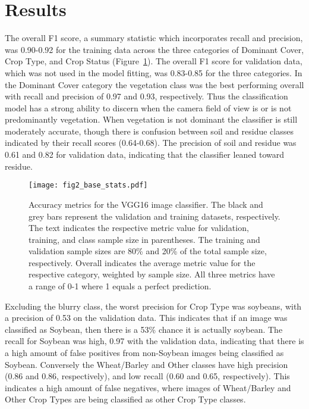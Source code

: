 \documentclass[remotesensing,article,submit,moreauthors,pdftex]{Definitions/mdpi}
\begin{document}
\section{Results}

The overall F1 score, a summary statistic which incorporates recall and precision, was 0.90-0.92 for the training data across the three categories of Dominant Cover, Crop Type, and Crop Status (Figure~\ref{fig2}). The overall F1 score for validation data, which was not used in the model fitting, was 0.83-0.85 for the three categories. In the Dominant Cover category the vegetation class was the best performing overall with recall and precision of 0.97 and 0.93, respectively. Thus the classification model has a strong ability to discern when the camera field of view is or is not predominantly vegetation. When vegetation is not dominant the classifier is still moderately accurate, though there is confusion between soil and residue classes indicated by their recall scores (0.64-0.68). The precision of soil and residue was 0.61 and 0.82 for validation data, indicating that the classifier leaned toward residue.

\begin{figure}[H]
    \centering
    \texttt{[image: fig2\_base\_stats.pdf]}
    \caption{Accuracy metrics for the VGG16 image classifier. The black and grey bars represent the validation and training datasets, respectively. The text indicates the respective metric value for validation, training, and class sample size in parentheses. The training and validation sample sizes are 80\% and 20\% of the total sample size, respectively. Overall indicates the average metric value for the respective category, weighted by sample size. All three metrics have a range of 0-1 where 1 equals a perfect prediction.}
    \label{fig2}
\end{figure}

Excluding the blurry class, the worst precision for Crop Type was soybeans, with a precision of 0.53 on the validation data. This indicates that if an image was classified as Soybean, then there is a 53\% chance it is actually soybean. The recall for Soybean was high, 0.97 with the validation data, indicating that there is a high amount of false positives from non-Soybean images being classified as Soybean. Conversely the Wheat/Barley and Other classes have high precision (0.86 and 0.86, respectively), and low recall (0.60 and 0.65, respectively). This indicates a high amount of false negatives, where images of Wheat/Barley and Other Crop Types are being classified as other Crop Type classes. 
\end{document}
